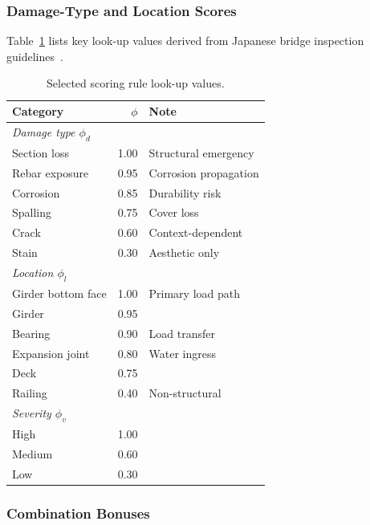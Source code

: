 \documentclass[twocolumn]{article}
\begin{document}
\subsubsection{Damage-Type and Location Scores}

Table~\ref{tab:scoring_rules} lists key look-up values derived from
Japanese bridge inspection guidelines~\cite{mlit2023bridge}.

\begin{table}[h]
\centering
\caption{Selected scoring rule look-up values.}
\label{tab:scoring_rules}
\begin{tabular}{lrl}
\toprule
\textbf{Category} & $\phi$ & \textbf{Note} \\
\midrule
\multicolumn{3}{l}{\textit{Damage type $\phi_d$}} \\
Section loss       & 1.00 & Structural emergency \\
Rebar exposure     & 0.95 & Corrosion propagation \\
Corrosion          & 0.85 & Durability risk \\
Spalling           & 0.75 & Cover loss \\
Crack              & 0.60 & Context-dependent \\
Stain              & 0.30 & Aesthetic only \\
\midrule
\multicolumn{3}{l}{\textit{Location $\phi_l$}} \\
Girder bottom face & 1.00 & Primary load path \\
Girder             & 0.95 & \\
Bearing            & 0.90 & Load transfer \\
Expansion joint    & 0.80 & Water ingress \\
Deck               & 0.75 & \\
Railing            & 0.40 & Non-structural \\
\midrule
\multicolumn{3}{l}{\textit{Severity $\phi_v$}} \\
High               & 1.00 & \\
Medium             & 0.60 & \\
Low                & 0.30 & \\
\bottomrule
\end{tabular}
\end{table}

\subsubsection{Combination Bonuses}
\end{document}

